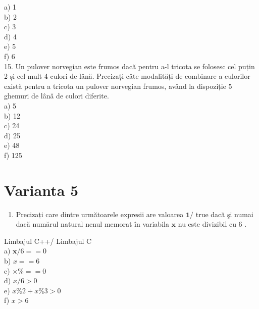 \documentclass[10pt]{article}
\begin{document}
a) 1\\
b) 2\\
c) 3\\
d) 4\\
e) 5\\
f) 6\\
15. Un pulover norvegian este frumos dacă pentru a-l tricota se folosesc cel puțin 2 și cel mult 4 culori de lână. Precizați câte modalități de combinare a culorilor există pentru a tricota un pulover norvegian frumos, având la dispoziție 5 ghemuri de lână de culori diferite.\\
a) 5\\
b) 12\\
c) 24\\
d) 25\\
e) 48\\
f) 125

\section*{Varianta 5}
\begin{enumerate}
  \item Precizați care dintre următoarele expresii are valoarea $\mathbf{1} /$ true dacă şi numai dacă numărul natural nenul memorat în variabila $\mathbf{x}$ nu este divizibil cu 6 .
\end{enumerate}

Limbajul C++/ Limbajul C\\
a) $\mathbf{x} / 6==0$\\
b) $x==6$\\
c) $\times \%==0$\\
d) $x / 6>0$\\
e) $x \% 2+x \% 3>0$\\
f) $x>6$
\end{document}
